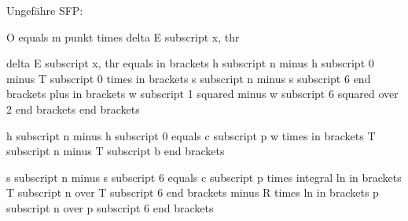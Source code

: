 Ungefähre SFP:

O equals m punkt times delta E subscript x, thr

delta E subscript x, thr equals in brackets h subscript n minus h subscript 0 minus T subscript 0 times in brackets s subscript n minus s subscript 6 end brackets plus in brackets w subscript 1 squared minus w subscript 6 squared over 2 end brackets end brackets

h subscript n minus h subscript 0 equals c subscript p w times in brackets T subscript n minus T subscript b end brackets

s subscript n minus s subscript 6 equals c subscript p times integral ln in brackets T subscript n over T subscript 6 end brackets minus R times ln in brackets p subscript n over p subscript 6 end brackets